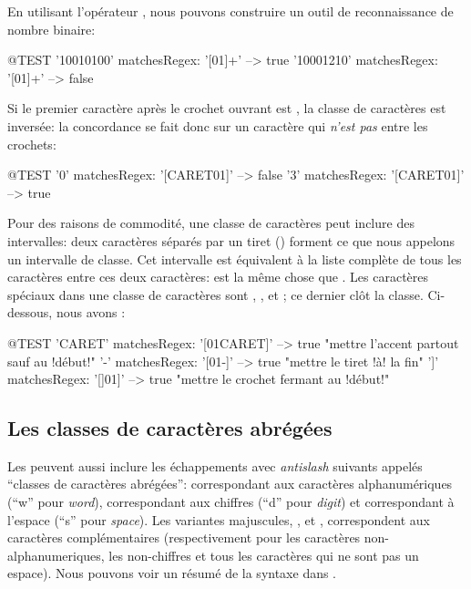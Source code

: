 \documentclass[a4paper,10pt,twoside]{book}
\begin{document}
{En utilisant l'opérateur \ct{+}, nous pouvons construire un outil de
reconnaissance de nombre binaire:
\begin{code}{@TEST}
'10010100' matchesRegex: '[01]+' --> true
'10001210' matchesRegex: '[01]+' --> false
\end{code}

Si le premier caractère après le crochet ouvrant est ,
la classe de caractères est inversée: la concordance se fait donc sur
un caractère qui \emph{n'est pas} entre les crochets:
\begin{code}{@TEST}
'0' matchesRegex: '[CARET01]' --> false
'3' matchesRegex: '[CARET01]' --> true
\end{code}

Pour des raisons de commodité, une classe de caractères peut inclure
des intervalles: deux caractères séparés par un tiret (\ct{-})
forment ce que nous appelons un intervalle de classe.
Cet intervalle est équivalent à la liste complète de tous les
caractères entre ces deux caractères:   est la même chose
que  .
Les caractères spéciaux dans une classe de caractères sont 
, \ct{-}, et \ct{]}; ce dernier clôt la classe. 
Ci-dessous, nous avons :
\begin{code}{@TEST}
'CARET' matchesRegex: '[01CARET]'   --> true    "mettre l'accent partout sauf au !début!"
'-' matchesRegex: '[01-]' --> true    "mettre le tiret !à! la fin"
']' matchesRegex: '[]01]'   --> true    "mettre le crochet fermant au
!début!"
\end{code}


\subsection{Les classes de caractères abrégées}
Les \expregs{} peuvent aussi inclure les échappements avec
\emph{antislash} suivants appelés ``classes de caractères abrégées'':
\ct{\w} correspondant aux caractères alphanumériques (``w'' pour
\emph{word}), \ct{\d} correspondant aux chiffres (``d'' pour
\emph{digit}) et \ct{\s} correspondant à l'espace (``s'' pour
\emph{space}).
Les variantes majuscules, \ct{\W}, \ct{\D} et \ct{\S}, correspondent
aux caractères complémentaires (respectivement pour les caractères
non-alphanumeriques, les non-chiffres et tous les caractères qui ne
sont pas un espace).
Nous pouvons voir un résumé de la syntaxe \pkgregex dans
.

}
\end{document}
